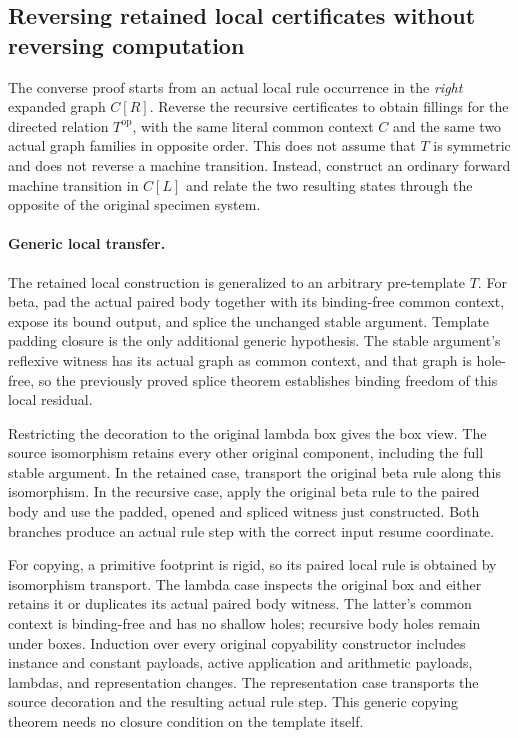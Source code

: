 \subsection{Reversing retained local certificates without reversing computation}
The converse proof starts from an actual local rule occurrence in the
\emph{right} expanded graph $C[R]$. Reverse the recursive certificates to
obtain fillings for the directed relation $T^{\mathrm{op}}$, with the same
literal common context $C$ and the same two actual graph families in
opposite order. This does not assume that $T$ is symmetric and does not
reverse a machine transition. Instead, construct an ordinary forward
machine transition in $C[L]$ and relate the two resulting states through
the opposite of the original specimen system.

\paragraph{Generic local transfer.}
The retained local construction is generalized to an arbitrary pre-template
$T$. For beta, pad the actual paired body together with its binding-free
common context, expose its bound output, and splice the unchanged stable
argument. Template padding closure is the only additional generic
hypothesis. The stable argument's reflexive witness has its actual graph
as common context, and that graph is hole-free, so the previously proved
splice theorem establishes binding freedom of this local residual.

Restricting the decoration to the original lambda box gives the box view.
The source isomorphism retains every other original component, including
the full stable argument. In the retained case, transport the original
beta rule along this isomorphism. In the recursive case, apply the original
beta rule to the paired body and use the padded, opened and spliced
witness just constructed. Both branches produce an actual rule step with
the correct input resume coordinate.

For copying, a primitive footprint is rigid, so its paired local rule is
obtained by isomorphism transport. The lambda case inspects the original
box and either retains it or duplicates its actual paired body witness.
The latter's common context is binding-free and has no shallow holes;
recursive body holes remain under boxes. Induction over every original
copyability constructor includes instance and constant payloads, active
application and arithmetic payloads, lambdas, and representation changes.
The representation case transports the source decoration and the resulting
actual rule step. This generic copying theorem needs no closure condition
on the template itself.

